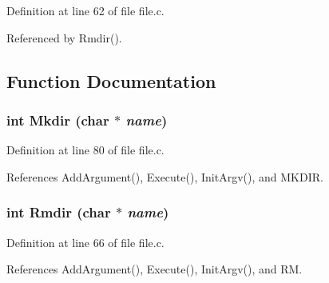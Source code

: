 Definition at line 62 of file file.c.

Referenced by Rmdir().

\subsection{Function Documentation}
\subsubsection{\setlength{\rightskip}{0pt plus 5cm}int Mkdir (char $\ast$ {\em name})}\label{file_8c_244d068470944621e2a49d524851541f}




Definition at line 80 of file file.c.

References Add\-Argument(), Execute(), Init\-Argv(), and MKDIR.
\subsubsection{\setlength{\rightskip}{0pt plus 5cm}int Rmdir (char $\ast$ {\em name})}\label{file_8c_0a261a55a87fb3d112e9a02f828b99c5}




Definition at line 66 of file file.c.

References Add\-Argument(), Execute(), Init\-Argv(), and RM.